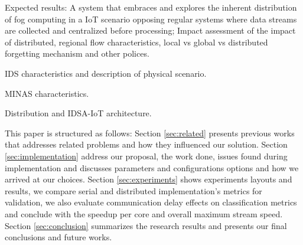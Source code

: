 \documentclass[conference]{IEEEtran}
\begin{document}





\begin{highlight}
Expected results:
A system that embraces and explores the inherent distribution of fog computing
in a IoT scenario opposing regular systems where data streams are collected and
centralized before processing;
Impact assessment of the impact of distributed, regional flow characteristics,
local vs global vs distributed forgetting mechanism and other polices.

IDS characteristics and description of physical scenario.

MINAS characteristics.

Distribution and IDSA-IoT architecture.
\end{highlight}

This paper is structured as follows:
Section \ref{sec:related} presents previous works that addresses related
problems and how they influenced our solution.
Section \ref{sec:implementation} address our proposal, the work done, issues
found during implementation and discusses parameters and configurations options
and how we arrived at our choices.
Section \ref{sec:experiments} shows experiments layouts and results, we
compare serial and distributed implementation's metrics for validation,
we also evaluate communication delay effects on classification metrics and
conclude with the speedup per core and overall maximum stream speed.
Section \ref{sec:conclusion} summarizes the research results and presents our
final conclusions and future works.
\end{document}
